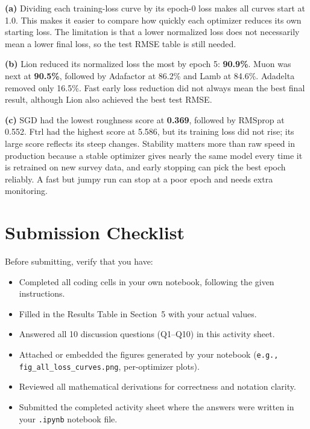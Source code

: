 \documentclass[12pt,a4paper]{article}
\begin{document}
\begin{answerbox}
\textbf{(a)} Dividing each training-loss curve by its epoch-0 loss makes all curves start at 1.0. This makes it easier to compare how quickly each optimizer reduces its own starting loss. The limitation is that a lower normalized loss does not necessarily mean a lower final loss, so the test RMSE table is still needed.

\textbf{(b)} Lion reduced its normalized loss the most by epoch 5: \textbf{90.9\%}. Muon was next at \textbf{90.5\%}, followed by Adafactor at 86.2\% and Lamb at 84.6\%. Adadelta removed only 16.5\%. Fast early loss reduction did not always mean the best final result, although Lion also achieved the best test RMSE.

\textbf{(c)} SGD had the lowest roughness score at \textbf{0.369}, followed by RMSprop at 0.552. Ftrl had the highest score at 5.586, but its training loss did not rise; its large score reflects its steep changes. Stability matters more than raw speed in production because a stable optimizer gives nearly the same model every time it is retrained on new survey data, and early stopping can pick the best epoch reliably. A fast but jumpy run can stop at a poor epoch and needs extra monitoring.
\end{answerbox}

\section*{Submission Checklist}

Before submitting, verify that you have:

\begin{itemize}[leftmargin=2em, label=$\square$]
  \item Completed all coding cells in your own notebook, following the given instructions.
  \item Filled in the Results Table in Section~5 with your actual values.
  \item Answered all 10 discussion questions (Q1–Q10) in this activity sheet.
  \item Attached or embedded the figures generated by your notebook
        (\texttt{e.g., }\\\texttt{fig\_all\_loss\_curves.png}, per-optimizer plots).
  \item Reviewed all mathematical derivations for correctness and notation clarity.
  \item Submitted the completed activity sheet where the answers were written in your
        \texttt{.ipynb} notebook file.
\end{itemize}
\end{document}
